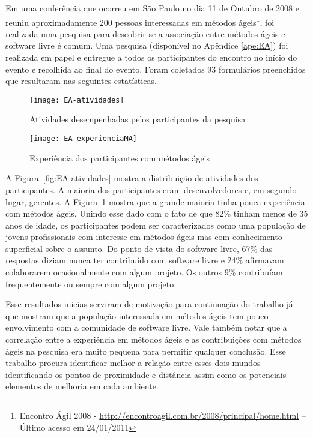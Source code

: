 Em uma conferência que ocorreu em São Paulo no dia 11 de Outubro de
2008 e reuniu aproximadamente 200 pessoas interessadas em métodos
ágeis\footnote{Encontro Ágil 2008 -
  \url{http://encontroagil.com.br/2008/principal/home.html} -- Último
  acesso em 24/01/2011}, foi realizada uma pesquisa para descobrir se
a associação entre métodos ágeis e software livre é comum. Uma
pesquisa (disponível no Apêndice \ref{ape:EA}) foi realizada em papel
e entregue a todos os participantes do encontro no início do evento e
recolhida ao final do evento. Foram coletados 93 formulários
preenchidos que resultaram nas seguintes estatísticas.

\begin{figure}[htb]
  \begin{minipage}[t]{0.5\linewidth}
    \centering
    \texttt{[image: EA-atividades]}
    \caption{Atividades desempenhadas pelos participantes da pesquisa}
    \label{fig:EA-atividades}
  \end{minipage}
  \begin{minipage}[t]{0.5\linewidth}
    \centering
    \texttt{[image: EA-experienciaMA]}
    \caption{Experiência dos participantes com métodos ágeis}
    \label{fig:EA-experienciaMA}
  \end{minipage}
\end{figure}

A Figura~\ref{fig:EA-atividades} mostra a distribuição de atividades
dos participantes. A maioria dos participantes eram desenvolvedores e,
em segundo lugar, gerentes. A Figura~\ref{fig:EA-experienciaMA} mostra
que a grande maioria tinha pouca experiência com métodos ágeis. Unindo
esse dado com o fato de que 82\% tinham menos de 35 anos de idade, os
participantes podem ser caracterizados como uma população de jovens
profissionais com interesse em métodos ágeis mas com conhecimento
superficial sobre o assunto. Do ponto de vista do software livre, 67\%
das respostas diziam nunca ter contribuído com software livre e 24\%
afirmavam colaborarem ocasionalmente com algum projeto. Os outros 9\%
contribuíam frequentemente ou sempre com algum projeto.

Esse resultados inicias serviram de motivação para continuação do
trabalho já que mostram que a população interessada em métodos ágeis
tem pouco envolvimento com a comunidade de software livre. Vale também
notar que a correlação entre a experiência em métodos ágeis e as
contribuições com métodos ágeis na pesquisa era muito pequena para
permitir qualquer conclusão. Esse trabalho procura identificar melhor
a relação entre esses dois mundos identificando os pontos de
proximidade e distância assim como os potenciais elementos de melhoria
em cada ambiente.

